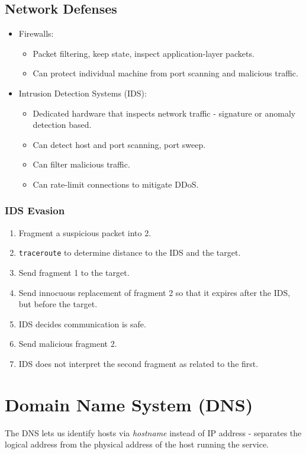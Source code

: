 \documentclass[11pt]{article}
\begin{document}
\subsection{Network Defenses}
\begin{itemize}
  \item Firewalls:
    \begin{itemize}
      \item Packet filtering, keep state, inspect application-layer packets.
      \item Can protect individual machine from port scanning and malicious traffic.
    \end{itemize}
  \item Intrusion Detection Systems (IDS):
    \begin{itemize}
      \item Dedicated hardware that inspects network traffic - signature or anomaly detection based.
      \item Can detect host and port scanning, port sweep.
      \item Can filter malicious traffic.
      \item Can rate-limit connections to mitigate DDoS.
    \end{itemize}
\end{itemize}

\subsubsection{IDS Evasion}
\begin{enumerate}
  \item Fragment a suspicious packet into 2.
  \item \texttt{traceroute} to determine distance to the IDS and the target.
  \item Send fragment 1 to the target.
  \item Send innocuous replacement of fragment 2 so that it expires after the IDS, but before the target.
  \item IDS decides communication is safe.
  \item Send malicious fragment 2.
  \item IDS does not interpret the second fragment as related to the first.
\end{enumerate}

\section{Domain Name System (DNS)}
The DNS lets us identify hosts via \textit{hostname} instead of IP address - separates the logical address from the physical address of the host running the service.
\end{document}
